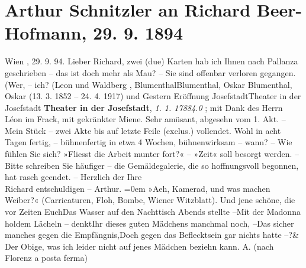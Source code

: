 \documentclass{book}
\newcommand{\stanzaend}{\&}
\begin{document}
              \section {Arthur Schnitzler an Richard Beer-Hofmann, 29. 9. 1894}  \beginnumbering
            \pstart
           Wien  , 29. 9. 94.\pend
           \pstart
           Lieber Richard, {zwei} (due) Karten hab ich Ihnen nach Pallanza  geschrieben – das ist doch mehr als Mau? – Sie sind
               offenbar verloren gegangen.\pend
           \pstart
           (Wer, – ich? (Leon   und Waldberg  , Blumenthal{Blumenthal, Oskar    {Blumenthal, Oskar} (13. 3. 1852 – 24. 4. 1917)  } und
                   \pend
           \pstart
           Gestern Eröffnung Josefstadt{Theater in der Josefstadt  \textbf{Theater in der Josefstadt}, \emph{1. 1. 17884.0}  }; mit Dank des Herrn Léon   im Frack, mit gekränkter Miene. Sehr amüsant,
               abgesehn vom 1. Akt. –\pend
           \pstart
           Mein Stück – zwei Akte bis auf
               letzte Feile (exclus.) vollendet. Wohl in acht Tagen fertig, – bühnenfertig in etwa
               4 Wochen, bühnenwirksam – wann? –\pend
           \pstart
           Wie fühlen Sie sich? »Fliesst die Arbeit munter fort?« –\pend
           \pstart
           »Zeit«
               soll besorgt werden. – Bitte schreiben Sie häufiger – die Gemäldegalerie, die so
               hoffnungsvoll begonnen, hat rasch geendet. –\pend
           \pstart
           Herzlich der Ihre{\\[\baselineskip]}  {{Richard} entschuldigen – Arthur.}\pend
           \leftskip=0em{}\pstart
           »Aeh, Kamerad, und was machen Weiber?« (Carricaturen, Floh, Bombe, Wiener
                  Witzblatt).\pend
           \stanza{}Und jene schöne, die vor Zeiten Euch\newverse{}Das Wasser auf den Nachttisch Abends stellte –\newverse{}Mit der Madonna holdem Lächeln – denkt\newverse{}Ihr dieses guten Mädchens manchmal noch, –\newverse{}Das sicher manches gegen die Empfängnis,\newverse{}Doch gegen das Beflecktsein gar nichts hatte –?\stanzaend{}\pstart
           Der Obige, was ich leider nicht auf jenes Mädchen beziehn kann.\pend
           \pstart
             {A.}\pend
           \pstart
           (nach Florenz  a posta ferma)\pend
           \endnumbering
\end{document}

